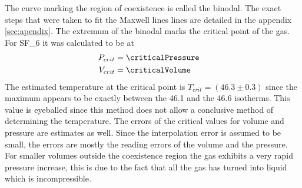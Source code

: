 \documentclass[a4paper,10pt,twocolumn]{article}
\begin{document}
    The curve marking the region of coexistence is called the binodal.
    The exact steps that were taken to fit the Maxwell lines lines are detailed in the appendix \ref{sec:apendix}. %
    The extremum of the binodal marks the critical point of the gas. 
    For SF_6\) it was calculated to be at
    \begin{align}
        P_{crit} &= \criticalPressure 
        \endline
        V_{crit} &= \criticalVolume 
        \end{align}
    The estimated temperature at the critical point is $T_{crit} = (46.3 \pm 0.3)$ since the maximum appears to be exactly between the 46.1\degree\) and the 46.6\degree\) isotherms.
    This value is eyeballed since this method does not allow a conclusive method of determining the temperature.
    The errors of the critical values for volume and pressure are estimates as well.
    Since the interpolation error is assumed to be small, the errors are mostly the reading errors of the volume and the pressure.
    For smaller volumes outside the coexistence region the gas exhibits a very rapid pressure increase, this is due to the fact that all the gas has turned into liquid which is incompressible.
\end{document}

